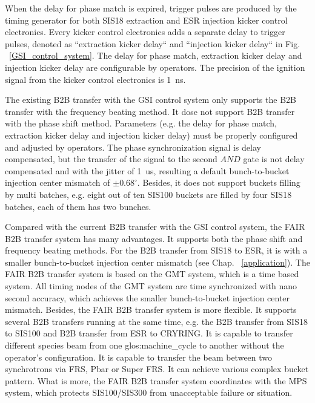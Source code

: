 When the delay for phase match is expired, trigger pulses are produced by the timing generator for both SIS18 extraction and ESR injection kicker control electronics. Every kicker control electronics adds a separate delay to trigger pulses, denoted as ``extraction kicker delay`` and ``injection kicker delay`` in Fig. ~\ref{GSI_control_system}. The delay for phase match, extraction kicker delay and injection kicker delay are configurable by operators. The precision of the ignition signal from the kicker control electronics is \SI{1}{ns}. 

The existing B2B transfer with the GSI control system only supports the B2B transfer with the frequency beating method. It dose not support B2B transfer with the phase shift method. Parameters (e.g. the delay for phase match, extraction kicker delay and injection kicker delay) must be properly configured and adjusted by operators. The phase synchronization signal is delay compensated, but the transfer of the signal to the second $\textit{AND}$ gate is not delay compensated and with the jitter of \SI{1}{us}, resulting a default bunch-to-bucket injection center mismatch of $\pm 0.68^\circ$. Besides, it does not support buckets filling by multi batches, e.g. eight out of ten SIS100 buckets are filled by four SIS18 batches, each of them has two bunches.

Compared with the current B2B transfer with the GSI control system, the FAIR B2B transfer system has many advantages. It supports both the phase shift and frequency beating methods. For the B2B transfer from SIS18 to ESR, it is with a smaller bunch-to-bucket injection center mismatch (see Chap. ~\ref{application}). The FAIR B2B transfer system is based on the GMT system, which is a time based system. All timing nodes of the GMT system are time synchronized with nano second accuracy, which achieves the smaller bunch-to-bucket injection center mismatch. Besides, the FAIR B2B transfer system is more flexible. It supports several B2B transfers running at the same time, e.g. the B2B transfer from SIS18 to SIS100 and B2B transfer from ESR to CRYRING. It is capable to transfer different species beam from one \gls{glos:machine_cycle} to another without the operator's configuration. It is capable to transfer the beam between two synchrotrons via \gls{FRS}, Pbar or Super FRS. It can achieve various complex bucket pattern. What is more, the FAIR B2B transfer system coordinates with the MPS system, which protects SIS100/SIS300 from unacceptable failure or situation. 


